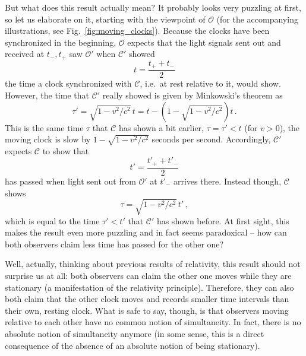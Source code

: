 \documentclass[../relativity_main.tex]{subfiles}
\begin{document}



But what does this result actually mean? It probably looks very puzzling at first, so let us elaborate on it, starting with the viewpoint of $\mathcal{O}$ (for the accompanying illustrations, see Fig.~\ref{fig:moving_clocks}). Because the clocks have been synchronized in the beginning, $\mathcal{O}$ expects that the light signals sent out and received at $t_-, t_+$ saw $\mathcal{O}'$ when $\mathcal{C}'$ showed
\begin{equation*}
	t = \frac{t_+ + t_-}{2}
\end{equation*}
the time a clock synchronized with $\mathcal{C}$, i.e.~at rest relative to it, would show. However, the time that $\mathcal{C}'$ really showed is given by Minkowski's theorem as
\begin{equation*}
	\tau' = \sqrt{1 - v^2 / c^2} \, t = t - (1 - \sqrt{1 - v^2 / c^2}) t \, .
\end{equation*}
This is the same time $\tau$ that $\mathcal{C}$ has shown a bit earlier, $\tau = \tau' < t$ (for $v > 0$), the moving clock is slow by $1 - \sqrt{1 - v^2 / c^2}$ seconds per second. Accordingly, $\mathcal{C}'$ expects $\mathcal{C}$ to show that
\begin{equation*}
	t' = \frac{t'_+ + t'_-}{2}
\end{equation*}
has passed when light sent out from $\mathcal{O}'$ at $t'_-$ arrives there. Instead though, $\mathcal{C}$ shows
\begin{equation*}
	\tau = \sqrt{1 - v^2 / c^2} \, t' \, ,
\end{equation*}
which is equal to the time $\tau' < t'$ that $\mathcal{C}'$ has shown before. At first sight, this makes the result even more puzzling and in fact seems paradoxical -- how can both observers claim less time has passed for the other one?


Well, actually, thinking about previous results of relativity, this result should not surprise us at all: both observers can claim the other one moves while they are stationary (a manifestation of the relativity principle). Therefore, they can also both claim that the other clock moves and records smaller time intervals than their own, resting clock. What is safe to say, though, is that observers moving relative to each other have no common notion of simultaneity. In fact, there is no absolute notion of simultaneity anymore (in some sense, this is a direct consequence of the absence of an absolute notion of being stationary). 
\end{document}

